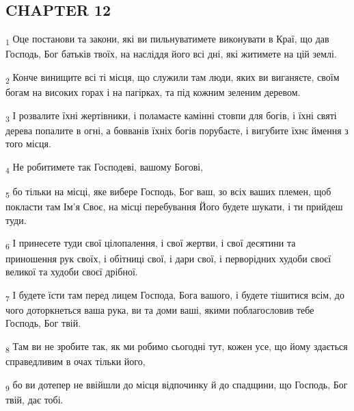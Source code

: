 \subsection{CHAPTER 12}
\begin{tcolorbox}
\textsubscript{1} Оце постанови та закони, які ви пильнуватимете виконувати в Краї, що дав Господь, Бог батьків твоїх, на насліддя його всі дні, які житимете на цій землі.
\end{tcolorbox}
\begin{tcolorbox}
\textsubscript{2} Конче винищите всі ті місця, що служили там люди, яких ви виганяєте, своїм богам на високих горах і на пагірках, та під кожним зеленим деревом.
\end{tcolorbox}
\begin{tcolorbox}
\textsubscript{3} І розвалите їхні жертівники, і поламаєте камінні стовпи для богів, і їхні святі дерева попалите в огні, а бовванів їхніх богів порубаєте, і вигубите їхнє ймення з того місця.
\end{tcolorbox}
\begin{tcolorbox}
\textsubscript{4} Не робитимете так Господеві, вашому Богові,
\end{tcolorbox}
\begin{tcolorbox}
\textsubscript{5} бо тільки на місці, яке вибере Господь, Бог ваш, зо всіх ваших племен, щоб покласти там Ім'я Своє, на місці перебування Його будете шукати, і ти прийдеш туди.
\end{tcolorbox}
\begin{tcolorbox}
\textsubscript{6} І принесете туди свої цілопалення, і свої жертви, і свої десятини та приношення рук своїх, і обітниці свої, і дари свої, і перворідних худоби своєї великої та худоби своєї дрібної.
\end{tcolorbox}
\begin{tcolorbox}
\textsubscript{7} І будете їсти там перед лицем Господа, Бога вашого, і будете тішитися всім, до чого доторкнеться ваша рука, ви та доми ваші, якими поблагословив тебе Господь, Бог твій.
\end{tcolorbox}
\begin{tcolorbox}
\textsubscript{8} Там ви не зробите так, як ми робимо сьогодні тут, кожен усе, що йому здається справедливим в очах тільки його,
\end{tcolorbox}
\begin{tcolorbox}
\textsubscript{9} бо ви дотепер не ввійшли до місця відпочинку й до спадщини, що Господь, Бог твій, дає тобі.
\end{tcolorbox}
